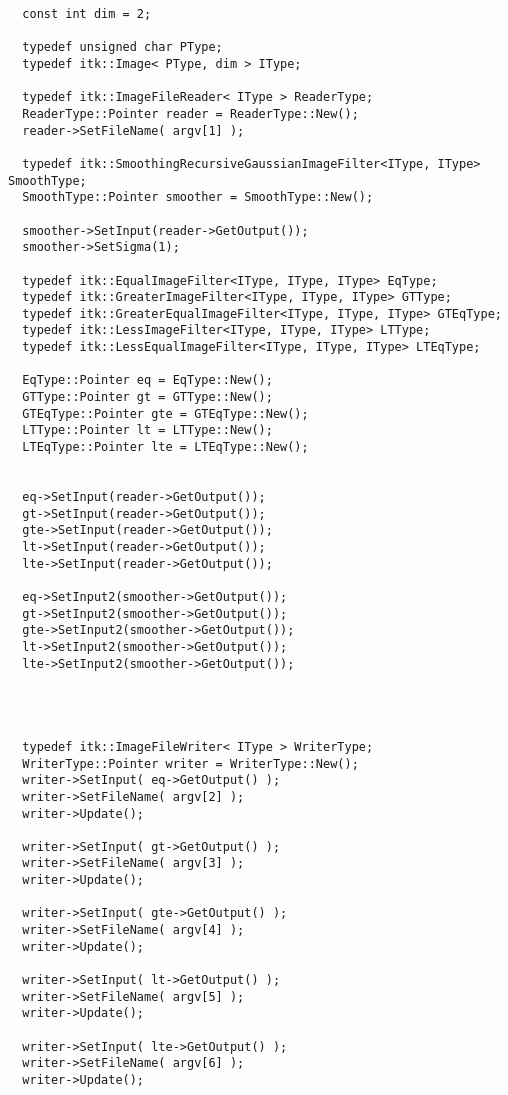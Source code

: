 \documentclass{InsightArticle}
\begin{document}
\begin{verbatim}
  const int dim = 2;
  
  typedef unsigned char PType;
  typedef itk::Image< PType, dim > IType;

  typedef itk::ImageFileReader< IType > ReaderType;
  ReaderType::Pointer reader = ReaderType::New();
  reader->SetFileName( argv[1] );

  typedef itk::SmoothingRecursiveGaussianImageFilter<IType, IType> SmoothType;
  SmoothType::Pointer smoother = SmoothType::New();

  smoother->SetInput(reader->GetOutput());
  smoother->SetSigma(1);

  typedef itk::EqualImageFilter<IType, IType, IType> EqType;
  typedef itk::GreaterImageFilter<IType, IType, IType> GTType;
  typedef itk::GreaterEqualImageFilter<IType, IType, IType> GTEqType;
  typedef itk::LessImageFilter<IType, IType, IType> LTType;
  typedef itk::LessEqualImageFilter<IType, IType, IType> LTEqType;

  EqType::Pointer eq = EqType::New();
  GTType::Pointer gt = GTType::New();
  GTEqType::Pointer gte = GTEqType::New();
  LTType::Pointer lt = LTType::New();
  LTEqType::Pointer lte = LTEqType::New();


  eq->SetInput(reader->GetOutput());
  gt->SetInput(reader->GetOutput());
  gte->SetInput(reader->GetOutput());
  lt->SetInput(reader->GetOutput());
  lte->SetInput(reader->GetOutput());

  eq->SetInput2(smoother->GetOutput());
  gt->SetInput2(smoother->GetOutput());
  gte->SetInput2(smoother->GetOutput());
  lt->SetInput2(smoother->GetOutput());
  lte->SetInput2(smoother->GetOutput());

  


  typedef itk::ImageFileWriter< IType > WriterType;
  WriterType::Pointer writer = WriterType::New();
  writer->SetInput( eq->GetOutput() );
  writer->SetFileName( argv[2] );
  writer->Update();

  writer->SetInput( gt->GetOutput() );
  writer->SetFileName( argv[3] );
  writer->Update();

  writer->SetInput( gte->GetOutput() );
  writer->SetFileName( argv[4] );
  writer->Update();

  writer->SetInput( lt->GetOutput() );
  writer->SetFileName( argv[5] );
  writer->Update();

  writer->SetInput( lte->GetOutput() );
  writer->SetFileName( argv[6] );
  writer->Update();

\end{verbatim}


\appendix





\nocite{ITKSoftwareGuide}
\end{document}
